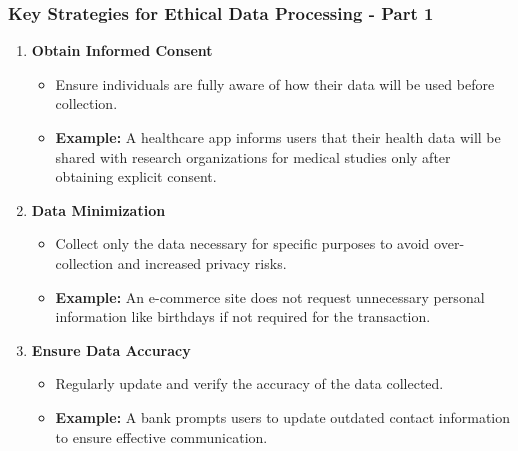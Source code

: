 \documentclass[aspectratio=169]{beamer}
\begin{document}
\begin{frame}[fragile]
    \frametitle{Key Strategies for Ethical Data Processing - Part 1}
    \begin{enumerate}
        \item \textbf{Obtain Informed Consent}
            \begin{itemize}
                \item Ensure individuals are fully aware of how their data will be used before collection.
                \item \textbf{Example:} A healthcare app informs users that their health data will be shared with research organizations for medical studies only after obtaining explicit consent.
            \end{itemize}
        
        \item \textbf{Data Minimization}
            \begin{itemize}
                \item Collect only the data necessary for specific purposes to avoid over-collection and increased privacy risks.
                \item \textbf{Example:} An e-commerce site does not request unnecessary personal information like birthdays if not required for the transaction.
            \end{itemize}
        
        \item \textbf{Ensure Data Accuracy}
            \begin{itemize}
                \item Regularly update and verify the accuracy of the data collected.
                \item \textbf{Example:} A bank prompts users to update outdated contact information to ensure effective communication.
            \end{itemize}
    \end{enumerate}
\end{frame}
\end{document}
